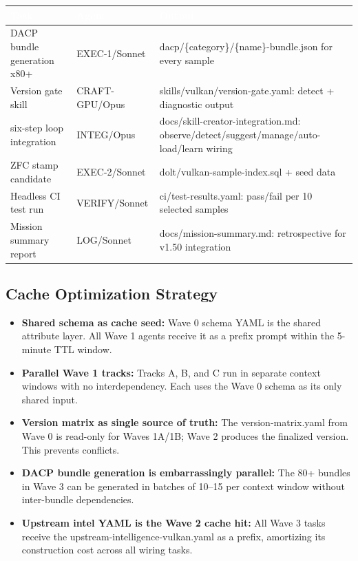 \documentclass[11pt,letterpaper]{article}
\newcommand{\tableheader}[1]{\textbf{\sffamily\textcolor{white}{#1}}}
\begin{document}
\begin{center}
\begin{tabularx}{\textwidth}{L{3.5cm}L{2cm}X}
\toprule
{}
\tableheader{Task} & \tableheader{Agent} & \tableheader{Output} \\
\midrule
DACP bundle generation x80+ & EXEC-1/Sonnet & dacp/\{category\}/\{name\}-bundle.json for every sample \\
Version gate skill & CRAFT-GPU/Opus & skills/vulkan/version-gate.yaml: detect + diagnostic output \\
six-step loop integration & INTEG/Opus & docs/skill-creator-integration.md: observe/detect/suggest/manage/auto-load/learn wiring \\
ZFC stamp candidate & EXEC-2/Sonnet & dolt/vulkan-sample-index.sql + seed data \\
Headless CI test run & VERIFY/Sonnet & ci/test-results.yaml: pass/fail per 10 selected samples \\
Mission summary report & LOG/Sonnet & docs/mission-summary.md: retrospective for v1.50 integration \\
\bottomrule
\end{tabularx}
\end{center}

\subsection{Cache Optimization Strategy}

\begin{itemize}[noitemsep]
  \item \textbf{Shared schema as cache seed:} Wave 0 schema YAML is the shared attribute layer. All Wave 1 agents receive it as a prefix prompt within the 5-minute TTL window.
  \item \textbf{Parallel Wave 1 tracks:} Tracks A, B, and C run in separate context windows with no interdependency. Each uses the Wave 0 schema as its only shared input.
  \item \textbf{Version matrix as single source of truth:} The version-matrix.yaml from Wave 0 is read-only for Waves 1A/1B; Wave 2 produces the finalized version. This prevents conflicts.
  \item \textbf{DACP bundle generation is embarrassingly parallel:} The 80+ bundles in Wave 3 can be generated in batches of 10--15 per context window without inter-bundle dependencies.
  \item \textbf{Upstream intel YAML is the Wave 2 cache hit:} All Wave 3 tasks receive the upstream-intelligence-vulkan.yaml as a prefix, amortizing its construction cost across all wiring tasks.
\end{itemize}
\end{document}
